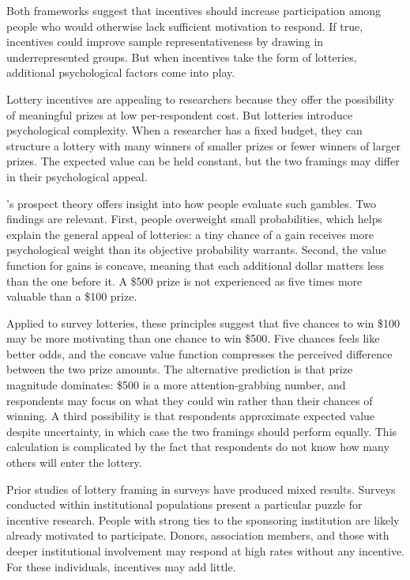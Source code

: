 Both frameworks suggest that incentives should increase participation among people who
would otherwise lack sufficient motivation to respond. If true, incentives could improve
sample representativeness by drawing in underrepresented groups. But when incentives take
the form of lotteries, additional psychological factors come into play.

Lottery incentives are appealing to researchers because they offer the possibility of
meaningful prizes at low per-respondent cost. But lotteries introduce psychological
complexity. When a researcher has a fixed budget, they can structure a lottery with many
winners of smaller prizes or fewer winners of larger prizes. The expected value can be
held constant, but the two framings may differ in their psychological appeal.

\textcite{Kahneman.Tversky1979}'s prospect theory offers insight into how people evaluate such
gambles. Two findings are relevant. First, people overweight small probabilities, which
helps explain the general appeal of lotteries: a tiny chance of a gain receives more
psychological weight than its objective probability warrants. Second, the value function
for gains is concave, meaning that each additional dollar matters less than the one
before it. A \$500 prize is not experienced as five times more valuable than a \$100
prize.

Applied to survey lotteries, these principles suggest that five chances to win \$100 may
be more motivating than one chance to win \$500. Five chances feels like better odds, and
the concave value function compresses the perceived difference between the two prize
amounts. The alternative prediction is that prize magnitude dominates: \$500 is a more
attention-grabbing number, and respondents may focus on what they could win rather than
their chances of winning. A third possibility is that respondents approximate expected
value despite uncertainty, in which case the two framings should perform equally. This
calculation is complicated by the fact that respondents do not know how many others will
enter the lottery.

Prior studies of lottery framing in surveys have produced mixed results. Surveys
conducted within institutional populations present a particular puzzle for incentive
research. People with strong ties to the sponsoring institution are likely already
motivated to participate. Donors, association members, and those with deeper institutional
involvement may respond at high rates without any incentive. For these individuals,
incentives may add little.


